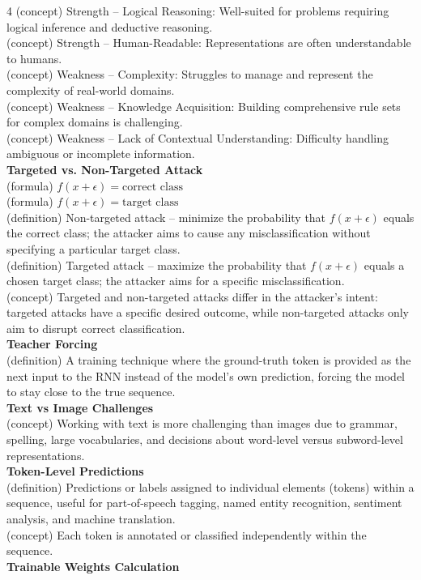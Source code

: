 \documentclass[8pt]{extarticle}
\begin{document}
\begin{multicols}{4}
{(concept) Strength -- Logical Reasoning: Well-suited for problems requiring logical inference and deductive reasoning.\\
(concept) Strength -- Human-Readable: Representations are often understandable to humans.\\
(concept) Weakness -- Complexity: Struggles to manage and represent the complexity of real-world domains.\\
(concept) Weakness -- Knowledge Acquisition: Building comprehensive rule sets for complex domains is challenging.\\
(concept) Weakness -- Lack of Contextual Understanding: Difficulty handling ambiguous or incomplete information.\\
\vspace{2pt}\textbf{Targeted vs. Non-Targeted Attack}\\
(formula) $f(x + \epsilon) = \text{correct class}$\\
(formula) $f(x + \epsilon) = \text{target class}$\\
(definition) Non-targeted attack -- minimize the probability that $f(x + \epsilon)$ equals the correct class; the attacker aims to cause any misclassification without specifying a particular target class.\\
(definition) Targeted attack -- maximize the probability that $f(x + \epsilon)$ equals a chosen target class; the attacker aims for a specific misclassification.\\
(concept) Targeted and non-targeted attacks differ in the attacker's intent: targeted attacks have a specific desired outcome, while non-targeted attacks only aim to disrupt correct classification.\\
\vspace{2pt}\textbf{Teacher Forcing}\\
(definition) A training technique where the ground-truth token is provided as the next input to the RNN instead of the model's own prediction, forcing the model to stay close to the true sequence.\\
\vspace{2pt}\textbf{Text vs Image Challenges}\\
(concept) Working with text is more challenging than images due to grammar, spelling, large vocabularies, and decisions about word-level versus subword-level representations.\\
\vspace{2pt}\textbf{Token-Level Predictions}\\
(definition) Predictions or labels assigned to individual elements (tokens) within a sequence, useful for part-of-speech tagging, named entity recognition, sentiment analysis, and machine translation.\\
(concept) Each token is annotated or classified independently within the sequence.\\
\vspace{2pt}\textbf{Trainable Weights Calculation}\\

}
\end{multicols}
\end{document}
